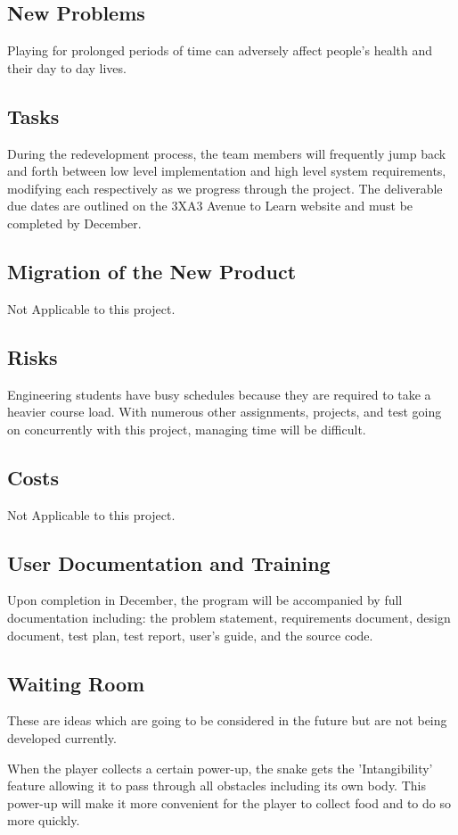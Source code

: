 \documentclass[12pt]{article}
\begin{document}
\subsection{New Problems}
	Playing for prolonged periods of time can adversely affect people's health and their day to day lives.
	
\subsection{Tasks}
	During the redevelopment process, the team members will frequently jump back and forth between low level implementation and high level system requirements, modifying each respectively as we progress through the project. The deliverable due dates are outlined on the 3XA3 Avenue to Learn website and must be completed by December.
\subsection{Migration of the New Product}
	Not Applicable to this project.

\subsection{Risks}
	Engineering students have busy schedules because they are required to take a heavier course load. With numerous other assignments, projects, and test going on concurrently with this project, managing time will be difficult. 
\subsection{Costs}
	Not Applicable to this project.

\subsection{User Documentation and Training}
	Upon completion in December, the program will be accompanied by full documentation including: the problem statement, requirements document, design document, test plan, test report, user's guide, and the source code. 
\subsection{Waiting Room}
	These are ideas which are going to be considered in the future but are not being developed currently.

	When the player collects a certain power-up, the snake gets the 'Intangibility' feature allowing it to pass through all obstacles including its own body. This power-up will make it more convenient for the player to collect food and to do so more quickly.
\end{document}
